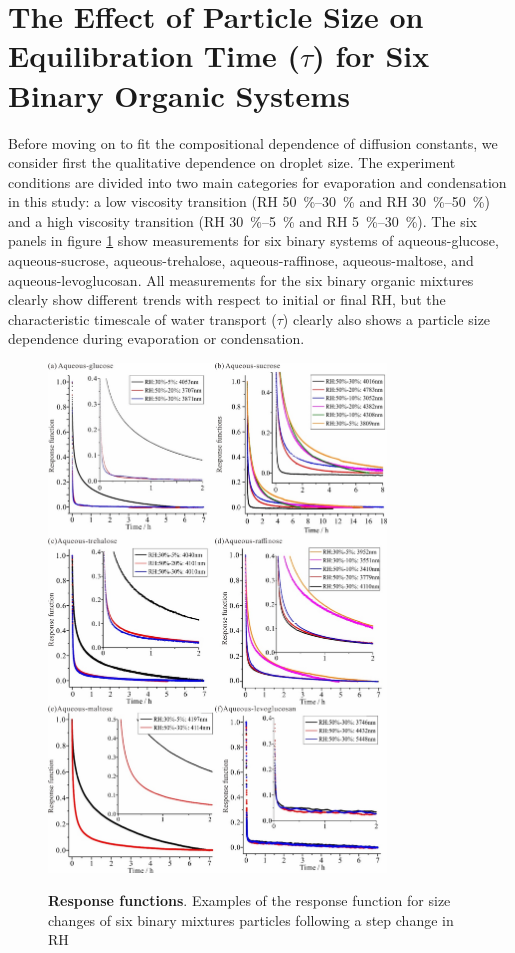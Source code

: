 \section{The Effect of Particle Size on Equilibration Time ($\tau$) for Six Binary Organic Systems}
Before moving on to fit the compositional dependence of diffusion constants, we consider first the qualitative dependence on droplet size. The experiment conditions are divided into two main categories for evaporation and condensation in this study: a low viscosity transition (RH \SIrange{50}{30}{\percent} and RH \SIrange{30}{50}{\percent}) and a high viscosity transition (RH \SIrange{30}{5}{\percent} and RH \SIrange{5}{30}{\percent}). The six panels in figure \ref{fig:wat_s2} show measurements for six binary systems of aqueous-glucose, aqueous-sucrose, aqueous-trehalose, aqueous-raffinose, aqueous-maltose, and aqueous-levoglucosan. All measurements for the six binary organic mixtures clearly show different trends with respect to initial or final RH, but the characteristic timescale of water transport ($\tau$) clearly also shows a particle size dependence during evaporation or condensation.

\begin{figure}
    \centering
    \caption{\textbf{Response functions}. Examples of the response function for size changes of six binary mixtures particles following a step change in RH}
    \includegraphics[width=0.8\textwidth]{chapters/water_hopping/figures/image004.jpg}
    \label{fig:wat_s2}
\end{figure}

